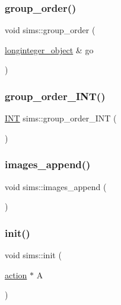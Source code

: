 \mbox{\label{classsims_aa442445175656570fa35febbe790efad}} 
\subsubsection{\texorpdfstring{group\+\_\+order()}{group\_order()}}
{\footnotesize\ttfamily void sims\+::group\+\_\+order (\begin{DoxyParamCaption}\item[{\mbox{\hyperlink{classlonginteger__object}{longinteger\+\_\+object}} \&}]{go }\end{DoxyParamCaption})}

\mbox{\label{classsims_a26f7773de3c1fafc2230349ea3e3bfcb}} 
\subsubsection{\texorpdfstring{group\+\_\+order\+\_\+\+I\+N\+T()}{group\_order\_INT()}}
{\footnotesize\ttfamily \mbox{\hyperlink{galois_8h_a09fddde158a3a20bd2dcadb609de11dc}{I\+NT}} sims\+::group\+\_\+order\+\_\+\+I\+NT (\begin{DoxyParamCaption}{ }\end{DoxyParamCaption})}

\mbox{\label{classsims_a2eedbb17ba9644f7d57d81dafab0eb01}} 
\subsubsection{\texorpdfstring{images\+\_\+append()}{images\_append()}}
{\footnotesize\ttfamily void sims\+::images\+\_\+append (\begin{DoxyParamCaption}{ }\end{DoxyParamCaption})}

\mbox{\label{classsims_a02eb61ed14f75cfe4dc0770142c1bff0}} 
\subsubsection{\texorpdfstring{init()}{init()}}
{\footnotesize\ttfamily void sims\+::init (\begin{DoxyParamCaption}\item[{\mbox{\hyperlink{classaction}{action}} $\ast$}]{A }\end{DoxyParamCaption})}

